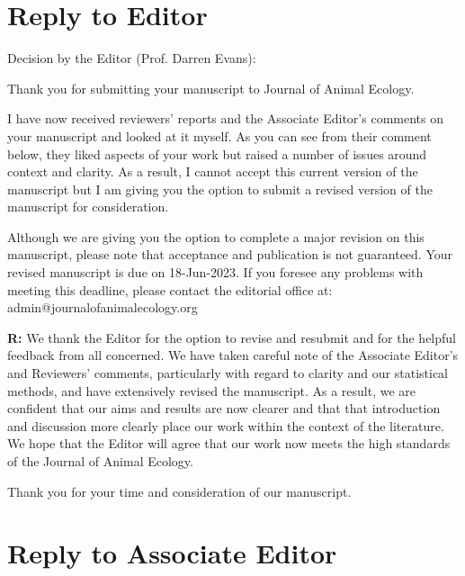 \documentclass[12pt]{article}
\newenvironment{refquote}{\bigskip \begin{it}}{\end{it}\medskip}
\begin{document}

\section*{Reply to Editor}

    \begin{refquote}
        Decision by the Editor (Prof. Darren Evans):

        Thank you for submitting your manuscript to Journal of Animal Ecology.

        I have now received reviewers' reports and the Associate Editor's comments on your manuscript and looked at it myself. As you can see from their comment below, they liked aspects of your work but raised a number of issues around context and clarity. As a result, I cannot accept this current version of the manuscript but I am giving you the option to submit a revised version of the manuscript for consideration.

        Although we are giving you the option to complete a major revision on this manuscript, please note that acceptance and publication is not guaranteed. Your revised manuscript is due on 18-Jun-2023. If you foresee any problems with meeting this deadline, please contact the editorial office at: admin@journalofanimalecology.org

    \end{refquote}
    

    \textbf{R:} We thank the Editor for the option to revise and resubmit and for the helpful feedback from all concerned. We have taken careful note of the Associate Editor's and Reviewers' comments, particularly with regard to clarity and our statistical methods, and have extensively revised the manuscript. As a result, we are confident that our aims and results are now clearer and that that introduction and discussion more clearly place our work within the context of the literature. We hope that the Editor will agree that our work now meets the high standards of the Journal of Animal Ecology.
    
    Thank you for your time and consideration of our manuscript.



\clearpage

\section*{Reply to Associate Editor}
\end{document}
